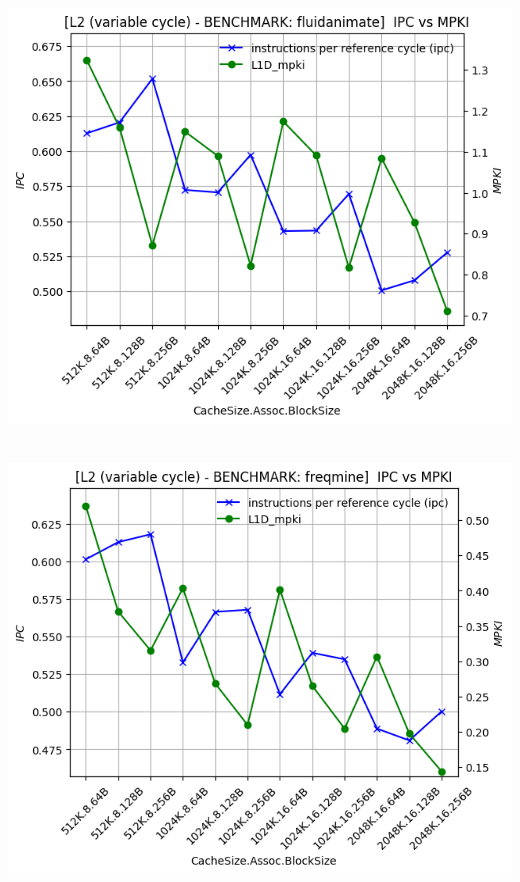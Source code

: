 \begin{minipage}{\textwidth}
    \begin{center}
        \\
        \vspace{3mm}
        \includegraphics[scale=0.65]{graphs/L2/var/fluidanimate.png}
        \vspace{6mm}
    \end{center}
\end{minipage}

\begin{minipage}{\textwidth}
    \begin{center}
        \\
        \vspace{3mm}
        \includegraphics[scale=0.65]{graphs/L2/var/freqmine.png}
        \vspace{6mm}
    \end{center}
\end{minipage}

